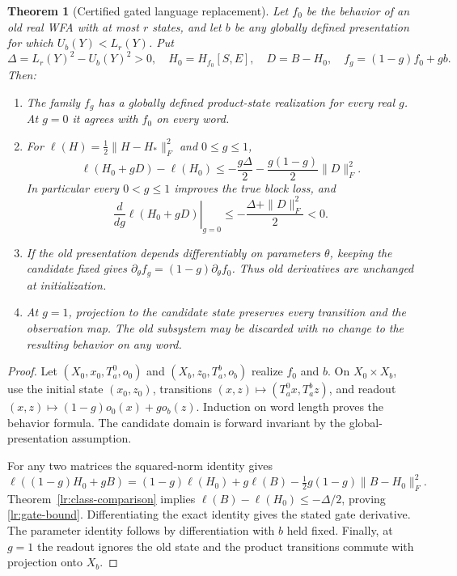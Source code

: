 \documentclass[11pt]{article}
\newtheorem{theorem}{Theorem}[section]
\theoremstyle{definition}
\begin{document}
\begin{theorem}[Certified gated language replacement]
\label{lr:replacement}
Let $f_0$ be the behavior of an old real WFA with at most $r$ states, and
let $b$ be any globally defined presentation for which
$U_b(Y)<L_r(Y)$. Put
\[
 \Delta=L_r(Y)^2-U_b(Y)^2>0,
 \quad H_0=H_{f_0}[S,E],\quad D=B-H_0,
 \quad f_g=(1-g)f_0+gb.
\]
Then:
\begin{enumerate}
\item The family $f_g$ has a globally defined product-state realization
      for every real $g$. At $g=0$ it agrees with $f_0$ on every word.
\item For $\ell(H)=\tfrac12\|H-H_*\|_F^2$ and $0\leq g\leq1$,
\begin{equation}
 \ell(H_0+gD)-\ell(H_0)
 \leq-\frac{g\Delta}{2}
       -\frac{g(1-g)}{2}\|D\|_F^2.
 \label{lr:gate-bound}
\end{equation}
In particular every $0<g\leq1$ improves the true block loss, and
\[
 \left.\frac{d}{dg}\ell(H_0+gD)\right|_{g=0}
 \leq-\frac{\Delta+\|D\|_F^2}{2}<0.
\]
\item If the old presentation depends differentiably on parameters
      $\theta$, keeping the candidate fixed gives
      $\partial_\theta f_g=(1-g)\partial_\theta f_0$.
      Thus old derivatives are unchanged at initialization.
\item At $g=1$, projection to the candidate state preserves every
      transition and the observation map. The old subsystem may be
      discarded with no change to the resulting behavior on any word.
\end{enumerate}
\end{theorem}
\begin{proof}
Let $(X_0,x_0,T_a^0,o_0)$ and $(X_b,z_0,T_a^b,o_b)$ realize $f_0$ and
$b$. On $X_0\times X_b$, use the initial state $(x_0,z_0)$, transitions
$(x,z)\mapsto(T_a^0x,T_a^bz)$, and readout
$(x,z)\mapsto(1-g)o_0(x)+go_b(z)$. Induction on word length proves the
behavior formula. The candidate domain is forward invariant by the
global-presentation assumption.

For any two matrices the squared-norm identity gives
\[
 \ell((1-g)H_0+gB)
 =(1-g)\ell(H_0)+g\ell(B)
  -\tfrac12g(1-g)\|B-H_0\|_F^2.
\]
Theorem~\ref{lr:class-comparison} implies
$\ell(B)-\ell(H_0)\leq-\Delta/2$, proving
\eqref{lr:gate-bound}. Differentiating the exact identity gives the
stated gate derivative. The parameter identity follows by differentiation
with $b$ held fixed. Finally, at $g=1$ the readout ignores the old state
and the product transitions commute with projection onto $X_b$.
\end{proof}
\end{document}
